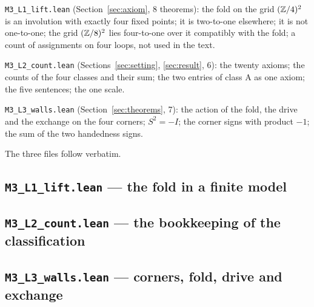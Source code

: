 \documentclass[11pt,a4paper]{article}
\theoremstyle{plain}
\theoremstyle{definition}
\theoremstyle{remark}
\begin{document}
\texttt{M3\_L1\_lift.lean} (Section~\ref{sec:axiom}, 8 theorems): the fold on the grid $(\mathbb{Z}/4)^{2}$ is an involution with exactly four fixed points; it is two-to-one elsewhere; it is not one-to-one; the grid $(\mathbb{Z}/8)^{2}$ lies four-to-one over it compatibly with the fold; a count of assignments on four loops, not used in the text.

\texttt{M3\_L2\_count.lean} (Sections~\ref{sec:setting}, \ref{sec:result}, 6): the twenty axioms; the counts of the four classes and their sum; the two entries of class A as one axiom; the five sentences; the one scale.

\texttt{M3\_L3\_walls.lean} (Section~\ref{sec:theorems}, 7): the action of the fold, the drive and the exchange on the four corners; $S^{2}=-I$; the corner signs with product $-1$; the sum of the two handedness signs.

The three files follow verbatim.

\subsection*{\texttt{M3\_L1\_lift.lean} --- the fold in a finite model}


\subsection*{\texttt{M3\_L2\_count.lean} --- the bookkeeping of the classification}


\subsection*{\texttt{M3\_L3\_walls.lean} --- corners, fold, drive and exchange}

\end{document}
